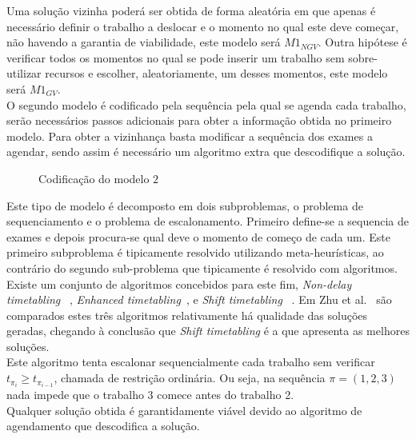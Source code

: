 Uma solução vizinha poderá ser obtida de forma aleatória em que apenas é necessário definir o trabalho a deslocar e o momento no qual este deve começar, não havendo a garantia de viabilidade, este modelo será $M1_{NGV}$. Outra hipótese é verificar todos os momentos no qual se pode inserir um trabalho sem sobre-utilizar recursos e escolher, aleatoriamente, um desses momentos, este modelo será $M1_{GV}$.\\

O segundo modelo é codificado pela sequência pela qual se agenda cada trabalho, serão necessários passos adicionais para obter a informação obtida no primeiro modelo. Para obter a vizinhança basta modificar a sequência dos exames a agendar, sendo assim é necessário um algoritmo extra que descodifique a solução.\\

\begin{figure}[h]
	\centering
	\makebox[\textwidth][c]{%
		\texttt{[image: P1M2]}
	}
	\caption{Codificação do modelo $2$}
	\label{fig:cod_prob1_mod2}
\end{figure}

Este tipo de modelo é decomposto em dois subproblemas, o problema de sequenciamento e o problema de escalonamento. Primeiro define-se a sequencia de exames e depois procura-se qual deve o momento de começo de cada um. Este primeiro subproblema é tipicamente resolvido utilizando meta-heurísticas, ao contrário do segundo sub-problema que tipicamente é resolvido com algoritmos.\\
Existe um conjunto de algoritmos concebidos para este fim, \textit{Non-delay timetabling}~\cite{schusterNowaitJobShop2006} , \textit{Enhanced timetabling}~\cite{framinanEnhancedTimetablingProcedure2006}, e \textit{Shift timetabling}~\cite{zhuCompleteLocalSearch2009} . Em Zhu et al.~\cite{zhuCompleteLocalSearch2009} são comparados estes três algoritmos relativamente há qualidade das soluções geradas, chegando à conclusão que \textit{Shift timetabling} é a que apresenta as melhores soluções.\\
Este algoritmo tenta escalonar sequencialmente cada trabalho sem verificar $t_{\pi_{i}} \geq t_{\pi_{i-1}}$, chamada de restrição ordinária. Ou seja, na sequência $\pi=(1,2,3)$ nada impede que o trabalho 3 comece antes do trabalho 2.\\
Qualquer solução obtida é garantidamente viável devido ao algoritmo de agendamento que descodifica a solução.\\

